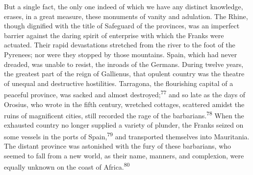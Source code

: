 

But a single fact, the only one indeed of which we have any
distinct knowledge, erases, in a great measure, these monuments
of vanity and adulation. The Rhine, though dignified with the
title of Safeguard of the provinces, was an imperfect barrier
against the daring spirit of enterprise with which the Franks
were actuated. Their rapid devastations stretched from the river
to the foot of the Pyrenees; nor were they stopped by those
mountains. Spain, which had never dreaded, was unable to resist,
the inroads of the Germans. During twelve years, the greatest
part of the reign of Gallienus, that opulent country was the
theatre of unequal and destructive hostilities. Tarragona, the
flourishing capital of a peaceful province, was sacked and almost
destroyed;\textsuperscript{77} and so late as the days of Orosius, who wrote in
the fifth century, wretched cottages, scattered amidst the ruins
of magnificent cities, still recorded the rage of the barbarians.\textsuperscript{78}
When the exhausted country no longer supplied a variety of
plunder, the Franks seized on some vessels in the ports of Spain,\textsuperscript{79}
and transported themselves into Mauritania. The distant
province was astonished with the fury of these barbarians, who
seemed to fall from a new world, as their name, manners, and
complexion, were equally unknown on the coast of Africa.\textsuperscript{80}



